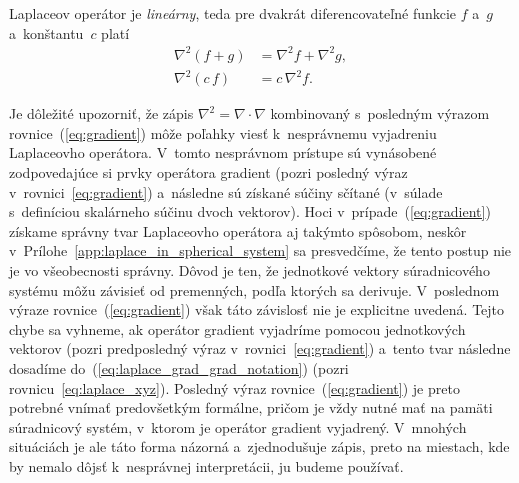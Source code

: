 \documentclass[a4paper, 12pt]{book}
\begin{document}
Laplaceov operátor je \emph{lineárny}, teda pre dvakrát diferencovateľné 
funkcie $f$ a~$g$ a~konštantu~$c$ platí
%
\begin{align}
\label{eq:laplace_additivity}
\nabla^2 \left(f + g \right) &= \nabla^2 f + \nabla^2 g{,}\\
%
\label{eq:laplace_homogenity}
\nabla^2 (c \, f) &= c \, \nabla^2 f{.}
\end{align}

Je dôležité upozorniť, že zápis $\nabla^2 = \nabla \cdot \nabla$ kombinovaný 
s~posledným výrazom rovnice~(\ref{eq:gradient}) môže poľahky viesť 
k~nesprávnemu vyjadreniu Laplaceovho operátora.  V~tomto nesprávnom prístupe sú 
vynásobené zodpovedajúce si prvky operátora gradient (pozri posledný výraz 
v~rovnici~\ref{eq:gradient}) a~následne sú získané súčiny sčítané (v~súlade 
s~definíciou skalárneho súčinu dvoch vektorov).  Hoci 
v~prípade~(\ref{eq:gradient}) získame správny tvar Laplaceovho operátora aj 
takýmto spôsobom, neskôr v~Prílohe~\ref{app:laplace_in_spherical_system} sa 
presvedčíme, že tento postup nie je vo všeobecnosti správny.  Dôvod je ten, že 
jednotkové vektory súradnicového systému môžu závisieť od premenných, podľa 
ktorých sa derivuje.  V~poslednom výraze rovnice~(\ref{eq:gradient}) však táto 
závislosť nie je explicitne uvedená.  Tejto chybe sa vyhneme, ak operátor 
gradient vyjadríme pomocou jednotkových vektorov (pozri predposledný výraz 
v~rovnici~\ref{eq:gradient}) a~tento tvar následne dosadíme 
do~(\ref{eq:laplace_grad_grad_notation}) (pozri rovnicu~\ref{eq:laplace_xyz}).  
Posledný výraz rovnice~(\ref{eq:gradient}) je preto potrebné vnímať 
predovšetkým formálne, pričom je vždy nutné mať na pamäti súradnicový systém, 
v~ktorom je operátor gradient vyjadrený.  V~mnohých situáciách je ale táto 
forma názorná a~zjednodušuje zápis, preto na miestach, kde by nemalo dôjsť 
k~nesprávnej interpretácii, ju budeme používať.
\end{document}
